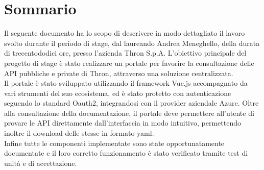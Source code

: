 \cleardoublepage
{}
{}
\begingroup
\let\clearpage\relax
\let\cleardoublepage\relax
\let\cleardoublepage\relax

\chapter*{Sommario}

Il seguente documento ha lo scopo di descrivere in modo dettagliato il lavoro svolto durante il periodo di stage, dal laureando Andrea Meneghello, della durata di trecentododici ore, presso l'azienda Thron S.p.A.
L'obiettivo principale del progetto di stage è stato realizzare un portale per favorire la consultazione delle API pubbliche e private di Thron, attraverso una soluzione centralizzata.\\
Il portale è stato sviluppato utilizzando il framework Vue.js accompagnato da vari strumenti del suo ecosistema, ed è stato protetto con autenticazione seguendo lo standard Oauth2, integrandosi con il provider aziendale Azure.
Oltre alla consultazione della documentazione, il portale deve permettere all'utente di provare le API direttamente dall'interfaccia in modo intuitivo, permettendo inoltre il download delle stesse in formato yaml.\\
Infine tutte le componenti implementate sono state opportunatamente documentate e il loro corretto funzionamento è stato verificato tramite test di unità e di accettazione.




\endgroup

\vfill
